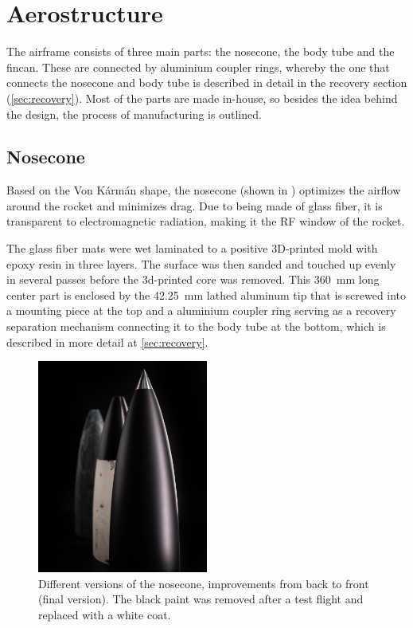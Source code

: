 \section{Aerostructure} %
\label{sec:aerostructure}
The airframe consists of three main parts: the nosecone, the body tube and the fincan. These are connected by aluminium coupler rings, whereby the one that connects the nosecone and body tube is described in detail in the recovery section (\cref{sec:recovery}). Most of the parts are made in-house, so besides the idea behind the design, the process of manufacturing is outlined.

\subsection{Nosecone}
Based on the Von Kármán shape, the nosecone (shown in ) optimizes the airflow around the rocket and minimizes drag. Due to being made of glass fiber, it is transparent to electromagnetic radiation, making it the RF window of the rocket.

The glass fiber mats were wet laminated to a positive 3D-printed mold with epoxy resin in three layers. The surface was then sanded and touched up evenly in several passes before the 3d-printed core was removed.
This \SI{360}{\milli\meter} long center part is enclosed by the \SI{42.25}{\milli\meter} lathed aluminum tip that is screwed into a mounting piece at the top and a aluminium coupler ring serving as a recovery separation mechanism connecting it to the body tube at the bottom, which is described in more detail at \cref{sec:recovery}.

\begin{figure} [H]
\centering
\includegraphics[width=0.5\textwidth]{Aerostructure/NC_4 (2).jpg}
\caption{Different versions of the nosecone, improvements from back to front (final version). The black paint was removed after a test flight and replaced with a white coat.}
\label{fig:aerostructure_nosecone}
\end{figure}

